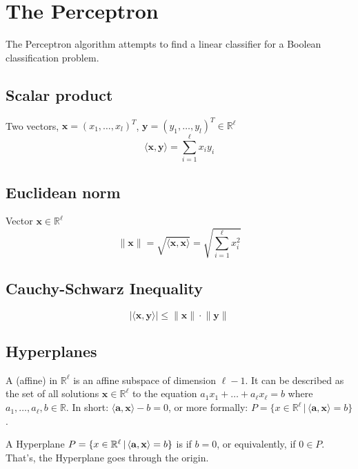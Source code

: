 \section{The Perceptron}
The Perceptron algorithm attempts to find a linear classifier for a Boolean classification problem.
\subsection{Scalar product}
Two vectors, $\mathbf{x} = (x_1,\ldots,x_l)^T$, $\mathbf{y} = (y_1,\ldots,y_l)^T \in \mathbb{R}^\ell$ 
\begin{equation*}
\langle \mathbf{x},\mathbf{y} \rangle = \sum_{i=1}^{\ell} x_iy_i
\end{equation*}
\subsection{Euclidean norm}
Vector $\mathbf{x} \in \mathbb{R}^\ell$ 
\begin{equation*}
\lVert \mathbf{x} \rVert = \sqrt{\langle \mathbf{x},\mathbf{x} \rangle} = \sqrt{ \sum_{i=1}^{\ell} x_i^2}
\end{equation*}
\subsection{Cauchy-Schwarz Inequality}
\begin{equation}
| \langle \mathbf{x},\mathbf{y} \rangle | \leq \lVert \mathbf{x} \rVert \cdot \lVert \mathbf{y} \rVert
\end{equation}

\subsection{Hyperplanes}
A (affine)  in $\mathbb{R}^\ell$ is an affine subspace of dimension $\ell -1$. It can be described as the set of all solutions $\mathbf{x} \in \mathbb{R}^\ell$ to the equation $a_1x_1 + \ldots + a_\ell x_\ell = b$ where $a_1,\ldots,a_\ell,b \in \mathbb{R}$. In short:  $\langle\mathbf{a}, \mathbf{x}\rangle - b=0$, or more formally: $P = \{x \in \mathbb{R}^\ell\,|\,\langle\mathbf{a}, \mathbf{x}\rangle = b\}$.

A Hyperplane $P = \{x \in \mathbb{R}^\ell\,|\, \langle\mathbf{a}, \mathbf{x}\rangle = b\}$ is  if $b = 0$, or equivalently, if $0 \in P$. That's, the Hyperplane goes through the origin.
